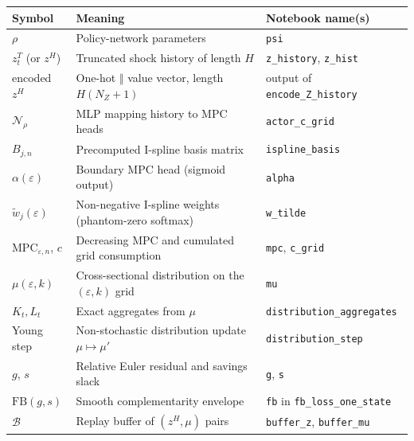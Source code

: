 \documentclass[11pt,a4paper]{report}
\begin{document}
\begin{definitionbox}
\footnotesize
\renewcommand{\arraystretch}{1.15}
\begin{tabular}{@{}L{2.6cm} L{6.2cm} L{4.4cm}@{}}
\toprule
\textbf{Symbol} & \textbf{Meaning} & \textbf{Notebook name(s)} \\
\midrule
$\rho$                                  & Policy-network parameters                                 & \texttt{psi} \\
$z_t^T$ (or $z^H$)                      & Truncated shock history of length $H$                     & \texttt{z\_history}, \texttt{z\_hist} \\
encoded $z^H$                           & One-hot $\Vert$ value vector, length $H(N_Z{+}1)$         & output of \texttt{encode\_Z\_history} \\
$\mathcal{N}_\rho$                      & MLP mapping history to MPC heads                          & \texttt{actor\_c\_grid} \\
$B_{j,n}$                               & Precomputed I-spline basis matrix                         & \texttt{ispline\_basis} \\
$\alpha(\varepsilon)$                   & Boundary MPC head (sigmoid output)                        & \texttt{alpha} \\
$\widetilde w_j(\varepsilon)$           & Non-negative I-spline weights (phantom-zero softmax)      & \texttt{w\_tilde} \\
$\mathrm{MPC}_{\varepsilon,n}$, $c$     & Decreasing MPC and cumulated grid consumption             & \texttt{mpc}, \texttt{c\_grid} \\
$\mu(\varepsilon, k)$                   & Cross-sectional distribution on the $(\varepsilon,k)$ grid & \texttt{mu} \\
$K_t, L_t$                              & Exact aggregates from $\mu$                               & \texttt{distribution\_aggregates} \\
Young step                              & Non-stochastic distribution update $\mu \mapsto \mu'$     & \texttt{distribution\_step} \\
$g$, $s$                                & Relative Euler residual and savings slack                 & \texttt{g}, \texttt{s} \\
$\mathrm{FB}(g,s)$                      & Smooth complementarity envelope                           & \texttt{fb} in \texttt{fb\_loss\_one\_state} \\
$\mathcal{B}$                           & Replay buffer of $(z^H, \mu)$ pairs                       & \texttt{buffer\_z}, \texttt{buffer\_mu} \\
\bottomrule
\end{tabular}
\end{definitionbox}
\end{document}
